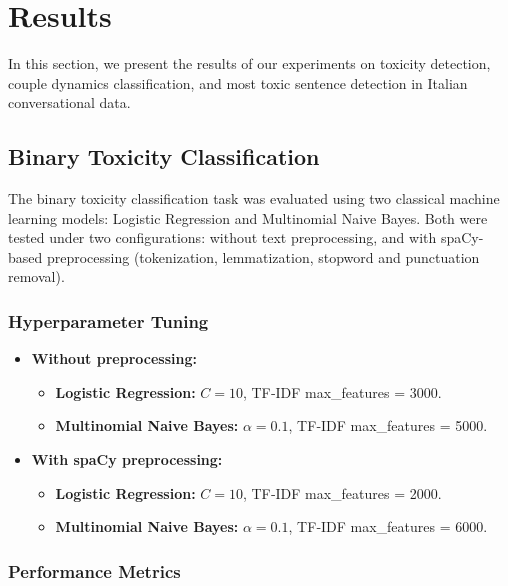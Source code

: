 \documentclass[conference]{IEEEtran}
\begin{document}
\section{Results}

In this section, we present the results of our experiments on toxicity detection, couple dynamics classification, and most toxic sentence detection in Italian conversational data.

\subsection{Binary Toxicity Classification}

The binary toxicity classification task was evaluated using two classical machine learning models: Logistic Regression and Multinomial Naive Bayes. Both were tested under two configurations: without text preprocessing, and with spaCy-based preprocessing (tokenization, lemmatization, stopword and punctuation removal).

\subsubsection{Hyperparameter Tuning}

\begin{itemize}
  \item \textbf{Without preprocessing:}
    \begin{itemize}
      \item \textbf{Logistic Regression:} $C = 10$, TF‑IDF max\_features = 3000.
      \item \textbf{Multinomial Naive Bayes:} $\alpha = 0.1$, TF‑IDF max\_features = 5000.
    \end{itemize}
  \item \textbf{With spaCy preprocessing:}
    \begin{itemize}
      \item \textbf{Logistic Regression:} $C = 10$, TF‑IDF max\_features = 2000.
      \item \textbf{Multinomial Naive Bayes:} $\alpha = 0.1$, TF‑IDF max\_features = 6000.
    \end{itemize}
\end{itemize}

\subsubsection{Performance Metrics}
\end{document}

